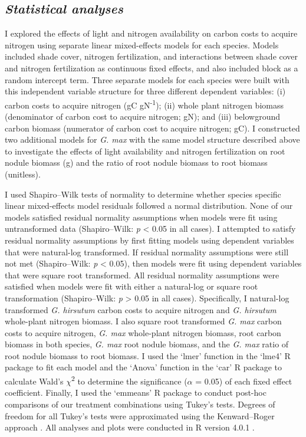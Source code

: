 \subsection{\textit{Statistical analyses}}
I explored the effects of light and nitrogen availability on carbon costs to acquire nitrogen using separate linear mixed-effects models for each species. Models included shade cover, nitrogen fertilization, and interactions between shade cover and nitrogen fertilization as continuous fixed effects, and also included block as a random intercept term. Three separate models for each species were built with this independent variable structure for three different dependent variables: (i) carbon costs to acquire nitrogen (gC gN\textsuperscript{-1}); (ii) whole plant nitrogen biomass (denominator of carbon cost to acquire nitrogen; gN); and (iii) belowground carbon biomass (numerator of carbon cost to acquire nitrogen; gC). I constructed two additional models for \textit{G. max} with the same model structure described above to investigate the effects of light availability and nitrogen fertilization on root nodule biomass (g) and the ratio of root nodule biomass to root biomass (unitless).

I used Shapiro–Wilk tests of normality to determine whether species specific linear mixed-effects model residuals followed a normal distribution. None of our models satisfied residual normality assumptions when models were fit using untransformed data (Shapiro–Wilk: \textit{p} < 0.05 in all cases). I attempted to satisfy residual normality assumptions by first fitting models using dependent variables that were natural-log transformed. If residual normality assumptions were still not met (Shapiro–Wilk: \textit{p} < 0.05), then models were fit using dependent variables that were square root transformed. All residual normality assumptions were satisfied when models were fit with either a natural-log or square root transformation (Shapiro–Wilk: \textit{p} > 0.05 in all cases). Specifically, I natural-log transformed \textit{G. hirsutum} carbon costs to acquire nitrogen and \textit{G. hirsutum} whole-plant nitrogen biomass. I also square root transformed \textit{G. max} carbon costs to acquire nitrogen, \textit{G. max} whole-plant nitrogen biomass, root carbon biomass in both species, \textit{G. max} root nodule biomass, and the \textit{G. max} ratio of root nodule biomass to root biomass. I used the ‘lmer’ function in the ‘lme4’ R package  to fit each model and the ‘Anova’ function in the ‘car’ R package  to calculate Wald’s $\chi$\textsuperscript{2} to determine the significance ($\alpha$ = 0.05) of each fixed effect coefficient. Finally, I used the ‘emmeans’ R package  to conduct post-hoc comparisons of our treatment combinations using Tukey’s tests. Degrees of freedom for all Tukey’s tests were approximated using the Kenward–Roger approach . All analyses and plots were conducted in R version 4.0.1 .

